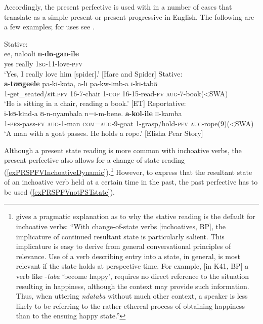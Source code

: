Accordingly, the present perfective is used with  in a number of cases that translate as a simple present or present progressive in English. The following are a few examples; for  uses see .
\begin{exe}
\ex \label{exAlsAnteriorOfResult1}Stative:\\
\gll ee, nalooli \textbf{n}-\textbf{dʊ}-\textbf{gan}-\textbf{ile}\\
yes really \textsc{1sg}-11-love-\textsc{pfv}\\
\glt `Yes, I really love him [spider].' [Hare and Spider]
\ex \label{exAlsAnteriorOfResult2}Stative:\\
\gll \textbf{a}-\textbf{tʊʊgeele} pa-kɪ-kota, a-lɪ pa-kw-ɪmb-a ɪ-kɪ-tabʊ\\
1-get\_seated/sit.\textsc{pfv} 16-7-chair 1-\textsc{cop} 16-15-read-\textsc{fv} \textsc{aug}-7-book(<SWA)\\
\glt `He is sitting in a chair, reading a book.' [ET]
\ex Reportative:\\
\gll i-kʊ-kɪnd-a ʊ-n-nyambala n=ɪ-m-bene. \textbf{a}-\textbf{kol}-\textbf{ile} ɪɪ-kamba\\
1-\textsc{prs}-pass-\textsc{fv} \textsc{aug}-1-man \textsc{com}=\textsc{aug}-9-goat 1-grasp/hold-\textsc{pfv} \textsc{aug}-rope(9)(<SWA)\\
\glt \lq A man with a goat passes. He holds a rope.' [Elisha Pear Story]
\end{exe}

Although a present state reading is more common with inchoative verbs, the present perfective also allows for a change-of-state reading (\ref{exPRSPFVInchoativeDynamic}).\footnote{\citet[127]{CraneTM2011} gives a pragmatic explanation as to why the stative reading is the default for inchoative verbs: ``With change-of-state verbs [inchoatives, BP], the implicature of continued resultant state is particularly salient. This implicature is easy to derive from general conversational principles of relevance. Use of a verb describing entry into a state, in general, is most relevant if the state holds at perspective time. For example, [in  K41, BP] a verb like -\textit{taba} \lq become happy', requires no direct reference to the situation resulting in happiness, although the context may provide such information. Thus, when uttering \textit{ndataba} without much other context, a speaker is less likely to be referring to the rather ethereal process of obtaining happiness than to the ensuing happy state.''} However, to express that the resultant state of an inchoative verb held at a certain time in the past, the past perfective has to be used (\ref{exPRSPFVnotPSTstate}).

